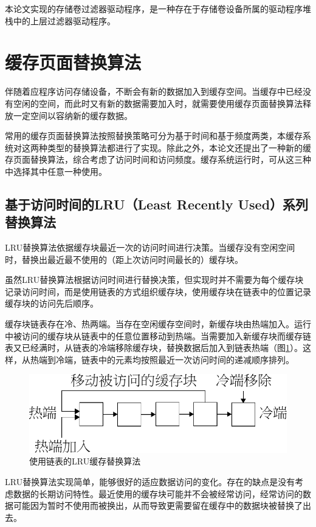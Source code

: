 本论文实现的存储卷过滤器驱动程序，是一种存在于存储卷设备所属的驱动程序堆栈中的上层过滤器驱动程序。

\section{缓存页面替换算法}
\label{sec:cache_algorithm}

伴随着应程序访问存储设备，不断会有新的数据加入到缓存空间。当缓存中已经没有空闲的空间，而此时又有新的数据需要加入时，就需要使用缓存页面替换算法释放一定空间以容纳新的缓存数据。

常用的缓存页面替换算法按照替换策略可分为基于时间和基于频度两类，本缓存系统对这两种类型的替换算法都进行了实现。除此之外，本论文还提出了一种新的缓存页面替换算法，综合考虑了访问时间和访问频度。缓存系统运行时，可从这三种中选择其中任意一种使用。

\subsection{基于访问时间的LRU（Least Recently Used）系列替换算法}

LRU替换算法\cite{LRU}依据缓存块最近一次的访问时间进行决策。当缓存没有空闲空间时，替换出最近最不使用的（距上次访问时间最长的）缓存块。

虽然LRU替换算法根据访问时间进行替换决策，但实现时并不需要为每个缓存块记录访问时间，而是使用链表的方式组织缓存块，使用缓存块在链表中的位置记录缓存块的访问先后顺序。

缓存块链表存在冷、热两端。当存在空闲缓存空间时，新缓存块由热端加入。运行中被访问的缓存块从链表中的任意位置移动到热端。当需要加入新缓存块而缓存链表又已经满时，从链表的冷端移除缓存块，替换数据后加入到链表热端（图\ref{fig:replace-algo-lru}）。这样，从热端到冷端，链表中的元素均按照最近一次访问时间的递减顺序排列。

\begin{figure}[H]
\centering
\includegraphics[width=0.6\linewidth]{./graph/replace-algo-lru}
\caption{使用链表的LRU缓存替换算法}
\label{fig:replace-algo-lru}
\end{figure}

LRU替换算法实现简单，能够很好的适应数据访问的变化。存在的缺点是没有考虑数据的长期访问特性。最近使用的缓存块可能并不会被经常访问，经常访问的数据可能因为暂时不使用而被换出，从而导致更需要留在缓存中的数据块被替换了出去。

